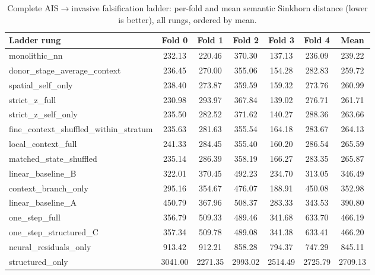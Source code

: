 \begin{table}[htbp]
  \centering
  \caption[Complete AIS$\rightarrow$invasive falsification ladder]{Complete AIS$\rightarrow$invasive
  falsification ladder: per-fold and mean semantic Sinkhorn distance (lower is better), all rungs,
  ordered by mean.}
  \label{tab:app-c-ladder-inv}
  \footnotesize
  \begin{tabular}{lcccccc}
    \toprule
    Ladder rung & Fold 0 & Fold 1 & Fold 2 & Fold 3 & Fold 4 & Mean \\
    \midrule
    monolithic\_nn & 232.13 & 220.46 & 370.30 & 137.13 & 236.09 & 239.22 \\
    donor\_stage\_average\_context & 236.45 & 270.00 & 355.06 & 154.28 & 282.83 & 259.72 \\
    spatial\_self\_only & 238.40 & 273.87 & 359.59 & 159.32 & 273.76 & 260.99 \\
    strict\_z\_full & 230.98 & 293.97 & 367.84 & 139.02 & 276.71 & 261.71 \\
    strict\_z\_self\_only & 235.50 & 282.52 & 371.62 & 140.27 & 288.36 & 263.66 \\
    fine\_context\_shuffled\_within\_stratum & 235.63 & 281.63 & 355.54 & 164.18 & 283.67 & 264.13 \\
    local\_context\_full & 241.33 & 284.45 & 355.40 & 160.20 & 286.54 & 265.59 \\
    matched\_state\_shuffled & 235.14 & 286.39 & 358.19 & 166.27 & 283.35 & 265.87 \\
    linear\_baseline\_B & 322.01 & 370.45 & 492.23 & 234.70 & 313.05 & 346.49 \\
    context\_branch\_only & 295.16 & 354.67 & 476.07 & 188.91 & 450.08 & 352.98 \\
    linear\_baseline\_A & 450.79 & 367.96 & 508.37 & 283.33 & 343.53 & 390.80 \\
    one\_step\_full & 356.79 & 509.33 & 489.46 & 341.68 & 633.70 & 466.19 \\
    one\_step\_structured\_C & 357.34 & 509.78 & 489.08 & 341.38 & 633.41 & 466.20 \\
    neural\_residuals\_only & 913.42 & 912.21 & 858.28 & 794.37 & 747.29 & 845.11 \\
    structured\_only & 3041.00 & 2271.35 & 2993.02 & 2514.49 & 2725.79 & 2709.13 \\
    \bottomrule
  \end{tabular}
\end{table}

